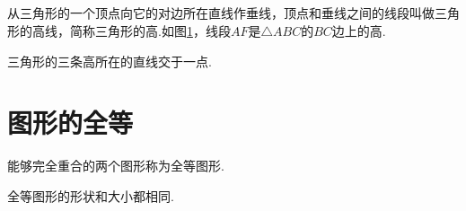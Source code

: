 \documentclass[fontset=windows]{ctexrep}
\begin{document}
\subsection{}
从三角形的一个顶点向它的对边所在直线作垂线，顶点和垂线之间的线段叫做{\heiti 三角形的高线}，简称{\heiti 三角形的高}.如图\ref{fig:三角形高}，线段$AF$是$\triangle ABC$的$BC$边上的高.
\begin{figure}[htbp]
    \centering
    \caption{}
    \label{fig:三角形高}
\end{figure}
\par {\heiti 三角形的三条高所在的直线交于一点.}
\section{图形的全等}
\par 能够完全重合的两个图形称为{\heiti 全等图形}.
\par {\heiti 全等图形的形状和大小都相同.}
\end{document}
